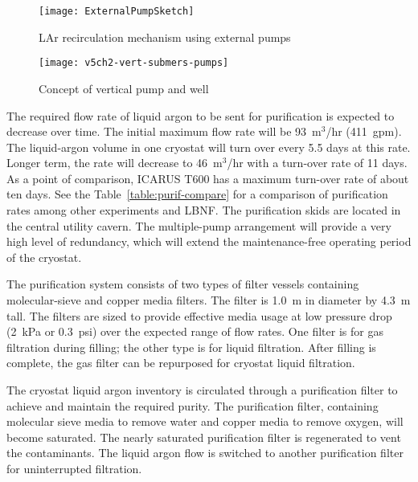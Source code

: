 \begin{figure}[htbp]
\centering
\texttt{[image: ExternalPumpSketch]}
\caption{LAr recirculation mechanism using external pumps}
\label{fig:external-pump}
\end{figure}

\begin{figure}[htbp]
\centering
\texttt{[image: v5ch2-vert-submers-pumps]}
\caption{Concept of vertical pump and well}
\label{fig:vert-submers-pumps}
\end{figure}

The required flow rate of liquid argon to be sent for purification 
is expected to decrease over time. The initial maximum flow rate 
will be 93~m$^3$/hr (411~gpm). The liquid-argon volume in one 
cryostat will turn over every 5.5 days at this rate. 
Longer term, the rate will decrease to 46~m$^3$/hr 
with a turn-over rate of 11 days.  As a point of comparison, ICARUS 
T600 has a maximum turn-over rate of about ten days. See the 
Table~\ref{table:purif-compare} for a comparison of purification 
rates among other experiments and LBNF. 
The purification skids are located in the central utility cavern.  
The multiple-pump arrangement will provide a very 
high level of redundancy, which will extend the maintenance-free 
operating period of the cryostat.  


The purification system consists of two types of filter vessels containing
 molecular-sieve and copper media filters. The filter is 1.0~m in 
diameter by 4.3~m tall. The filters are sized to provide effective 
media usage at low pressure drop (2~kPa or 0.3~psi) over the 
expected range of flow rates. One filter is for gas filtration 
during filling; the other type is for liquid filtration. After filling 
is complete, the gas filter can be repurposed for cryostat 
liquid filtration.

The cryostat liquid argon inventory is circulated through a purification 
filter to achieve and maintain the required purity. The purification filter,
 containing molecular sieve media to remove water and copper media to 
remove oxygen, will become saturated. The nearly saturated purification 
filter is regenerated to vent the contaminants. The liquid argon flow 
is switched to another purification filter for uninterrupted filtration. 

